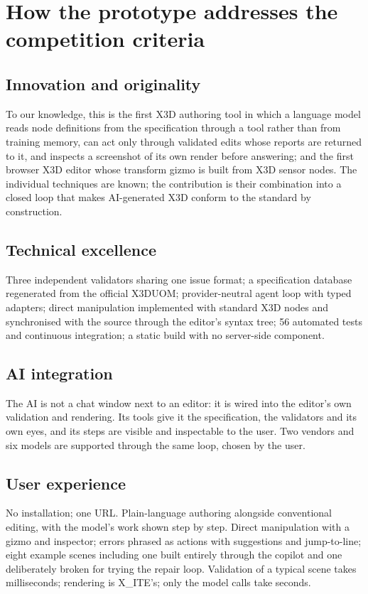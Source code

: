 \documentclass[10pt,a4paper]{article}
\begin{document}
\section{How the prototype addresses the competition criteria}
\subsection{Innovation and originality}
To our knowledge, this is the first X3D authoring tool in which a language model reads node definitions from the specification through a tool rather than from training memory, can act only through validated edits whose reports are returned to it, and inspects a screenshot of its own render before answering; and the first browser X3D editor whose transform gizmo is built from X3D sensor nodes. The individual techniques are known; the contribution is their combination into a closed loop that makes AI-generated X3D conform to the standard by construction.

\subsection{Technical excellence}
Three independent validators sharing one issue format; a specification database regenerated from the official X3DUOM; provider-neutral agent loop with typed adapters; direct manipulation implemented with standard X3D nodes and synchronised with the source through the editor's syntax tree; 56 automated tests and continuous integration; a static build with no server-side component.

\subsection{AI integration}
The AI is not a chat window next to an editor: it is wired into the editor's own validation and rendering. Its tools give it the specification, the validators and its own eyes, and its steps are visible and inspectable to the user. Two vendors and six models are supported through the same loop, chosen by the user.

\subsection{User experience}
No installation; one URL. Plain-language authoring alongside conventional editing, with the model's work shown step by step. Direct manipulation with a gizmo and inspector; errors phrased as actions with suggestions and jump-to-line; eight example scenes including one built entirely through the copilot and one deliberately broken for trying the repair loop. Validation of a typical scene takes milliseconds; rendering is X\_ITE's; only the model calls take seconds.
\end{document}
